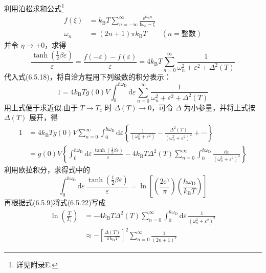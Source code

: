 利用泊松求和公式\footnote{详见附录E.}
\begin{equation}
\begin{aligned}
  f(\xi)&=k_{\mathrm{B}}T\sum_{n=-\infty}^{\infty}
  \frac{\mathrm{e}^{\mathrm{i}\omega_{n}\eta}}{\mathrm{i}\omega_{n}-\xi}\\
  \omega_{n}&=(2n+1)\pi k_{\mathrm{B}}T\qquad(n=\text{整数})
\end{aligned}
\end{equation}
并令 $\eta\to+0$，求得
\begin{equation}
  \frac{\tanh\left(\frac{1}{2}\beta\varepsilon\right)}{\varepsilon}
  =\frac{f(-\varepsilon)-f(\varepsilon)}{\varepsilon}
  =4k_{\mathrm{B}}T\sum_{n=0}^{\infty}
  \frac{1}{\omega_{n}^{2}+\varepsilon^{2}+\Delta^{2}(T)}
\end{equation}
代入式(6.5.18)，将自洽方程用下列级数的积分表示：
\begin{equation}
  1=4k_{\mathrm{B}}Tg(0)V\int_{0}^{\hbar\omega_{\mathrm{D}}}\mathrm{d}\varepsilon
  \sum_{n=0}^{\infty}
  \frac{1}{\omega_{n}^{2}+\varepsilon^{2}+\Delta^{2}(T)}
\end{equation}
用上式便于求近似.由于 $T\to T_{\mathrm{c}}$ 时 $\Delta(T)\to0$，可令 $\Delta$ 为小参量，并将上式按 $\Delta(T)$ 展开，得
\begin{equation}
\begin{aligned}
  1&=4k_{\mathrm{B}}Tg(0)V\sum_{n=0}^{\infty}\int_{0}^{\hbar\omega_{\mathrm{D}}}
  \mathrm{d}\varepsilon\left\{\frac{1}{\left(\omega_{n}^{2}+\varepsilon^{2}\right)}
  -\frac{\Delta^{2}(T)}{\left(\omega_{n}^{2}+\varepsilon^{2}\right)^{2}}+\cdots\right\}\\
  &=g(0)V\left\{\int_{0}^{\hbar\omega_{\mathrm{D}}}\mathrm{d}\varepsilon\,
  \frac{\tanh\left(\frac{1}{2}\beta\varepsilon\right)}{\varepsilon}
  -4k_{\mathrm{B}}T\Delta^{2}(T)\sum_{n=0}^{\infty}
  \int_{0}^{\hbar\omega_{\mathrm{D}}}
  \frac{\mathrm{d}\varepsilon}{\left(\omega_{n}^{2}+\varepsilon^{2}\right)^{2}}\right\}
\end{aligned}
\end{equation}
利用欧拉积分，求得式中的
\begin{equation}
  \int_{0}^{\hbar\omega_{\mathrm{D}}}\mathrm{d}\varepsilon\,
  \frac{\tanh\left(\frac{1}{2}\beta\varepsilon\right)}{\varepsilon}
  =\ln\left[\left(\frac{2\mathrm{e}^{\gamma}}{\pi}\right)
  \left(\frac{\hbar\omega_{\mathrm{D}}}{k_{\mathrm{B}}T}\right)\right]
\end{equation}
再根据式(6.5.9)将式(6.5.22)写成
\begin{equation}
\begin{aligned}
  \ln\left(\frac{T}{T_{\mathrm{c}}}\right)
  &=-4k_{\mathrm{B}}T\Delta^{2}(T)\sum_{n=0}^{\infty}
  \int_{0}^{\hbar\omega_{\mathrm{D}}}\mathrm{d}\varepsilon\,
  \frac{1}{\left(\omega_{n}^{2}+\varepsilon^{2}\right)^{2}}\\
  &\approx-\left[\frac{\Delta(T)}{\pi k_{\mathrm{B}}T}\right]^{2}
  \sum_{n=0}^{\infty}\frac{1}{(2n+1)^{3}}
\end{aligned}
\end{equation}
